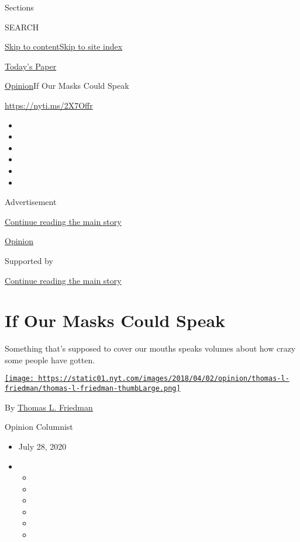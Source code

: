 Sections

SEARCH

\protect\hyperlink{site-content}{Skip to
content}\protect\hyperlink{site-index}{Skip to site index}

\href{https://myaccount.nytimes.com/auth/login?response_type=cookie\&client_id=vi}{}

\href{https://www.nytimes.com/section/todayspaper}{Today's Paper}

\href{/section/opinion}{Opinion}\textbar{}If Our Masks Could Speak

\url{https://nyti.ms/2X7Offr}

\begin{itemize}
\item
\item
\item
\item
\item
\item
\end{itemize}

Advertisement

\protect\hyperlink{after-top}{Continue reading the main story}

\href{/section/opinion}{Opinion}

Supported by

\protect\hyperlink{after-sponsor}{Continue reading the main story}

\hypertarget{if-our-masks-could-speak}{%
\section{If Our Masks Could Speak}\label{if-our-masks-could-speak}}

Something that's supposed to cover our mouths speaks volumes about how
crazy some people have gotten.

\href{https://www.nytimes.com/by/thomas-l-friedman}{\texttt{[image: https://static01.nyt.com/images/2018/04/02/opinion/thomas-l-friedman/thomas-l-friedman-thumbLarge.png]}}

By \href{https://www.nytimes.com/by/thomas-l-friedman}{Thomas L.
Friedman}

Opinion Columnist

\begin{itemize}
\item
  July 28, 2020
\item
  \begin{itemize}
  \item
  \item
  \item
  \item
  \item
  \item
  \end{itemize}
\end{itemize}


